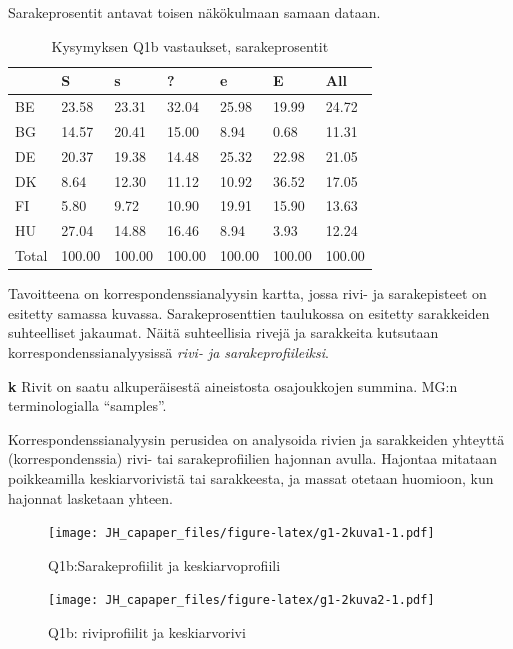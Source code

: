 \documentclass[
  finnish,
]{book}
\begin{document}
Sarakeprosentit antavat toisen näkökulmaan samaan dataan.

\begin{table}

\caption{\label{tab:simpeCA-cprosTa1}Kysymyksen Q1b vastaukset, sarakeprosentit}
\centering
\begin{tabular}[t]{lllllll}
\toprule
  & S & s & ? & e & E & All\\
\midrule
BE & 23.58 & 23.31 & 32.04 & 25.98 & 19.99 & 24.72\\
BG & 14.57 & 20.41 & 15.00 & 8.94 & 0.68 & 11.31\\
DE & 20.37 & 19.38 & 14.48 & 25.32 & 22.98 & 21.05\\
DK & 8.64 & 12.30 & 11.12 & 10.92 & 36.52 & 17.05\\
FI & 5.80 & 9.72 & 10.90 & 19.91 & 15.90 & 13.63\\
\addlinespace
HU & 27.04 & 14.88 & 16.46 & 8.94 & 3.93 & 12.24\\
Total & 100.00 & 100.00 & 100.00 & 100.00 & 100.00 & 100.00\\
\bottomrule
\end{tabular}
\end{table}

Tavoitteena on korrespondenssianalyysin kartta, jossa rivi- ja sarakepisteet on
esitetty samassa kuvassa. Sarakeprosenttien taulukossa on esitetty sarakkeiden
suhteelliset jakaumat. Näitä suhteellisia rivejä ja sarakkeita kutsutaan
korrespondenssianalyysissä \emph{rivi- ja sarakeprofiileiksi}.

\textbf{k} Rivit on saatu alkuperäisestä aineistosta osajoukkojen summina. MG:n
terminologialla ``samples''.

Korrespondenssianalyysin perusidea on analysoida rivien ja sarakkeiden yhteyttä
(korrespondenssia) rivi- tai sarakeprofiilien hajonnan avulla. Hajontaa mitataan
poikkeamilla keskiarvorivistä tai sarakkeesta, ja massat otetaan huomioon,
kun hajonnat lasketaan yhteen.

\begin{figure}
\centering
\texttt{[image: JH\_capaper\_files/figure-latex/g1-2kuva1-1.pdf]}
\caption{\label{fig:g1-2kuva1}Q1b:Sarakeprofiilit ja keskiarvoprofiili}
\end{figure}

\begin{figure}
\centering
\texttt{[image: JH\_capaper\_files/figure-latex/g1-2kuva2-1.pdf]}
\caption{\label{fig:g1-2kuva2}Q1b: riviprofiilit ja keskiarvorivi}
\end{figure}
\end{document}
